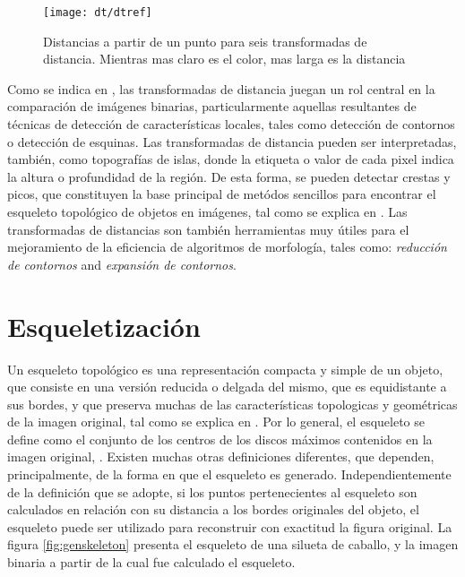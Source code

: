 \begin{figure}[h t b p ! H]
 \centering
   \texttt{[image: dt/dtref]}
 \caption[Distancias a partir de un punto para seis transformadas de distancia]{ 
   Distancias a partir de un punto para seis transformadas de distancia. Mientras 
   mas claro es el color, mas larga es la distancia \cite[p.365]{dtresearch}}
 \label{fig:dtexamples}
\end{figure}

Como se indica en \cite{dtresearch2}, las transformadas de distancia juegan un rol
central en la comparaci\'on de im\'agenes binarias, particularmente aquellas
resultantes de t\'ecnicas de detecci\'on de caracter\'isticas locales, tales 
como detecci\'on de contornos o detecci\'on de esquinas.
Las transformadas de distancia pueden ser interpretadas, tambi\'en, como
topograf\'ias de islas, donde la etiqueta o valor de cada pixel indica la altura o 
profundidad de la regi\'on. De esta forma, se pueden detectar crestas y picos, 
que constituyen la base principal de met\'odos sencillos para encontrar el 
esqueleto topol\'ogico de objetos en im\'agenes, tal como se explica en \cite[237]{ridgedt}.
Las transformadas de distancias son tambi\'en herramientas muy \'utiles para el 
mejoramiento de la eficiencia de algoritmos de morfolog\'ia, tales como: 
\emph{reducci\'on de contornos} and \emph{expansi\'on de contornos}.\\

\section{Esqueletizaci\'on}
\label{sec:skeletonization}

Un esqueleto topol\'ogico es una representaci\'on compacta y simple de un objeto, que
consiste en una versi\'on reducida o delgada del mismo, que es equidistante a sus bordes, 
y que preserva muchas de las caracter\'isticas topologicas y geom\'etricas de la
imagen original, tal como se explica en \cite{wikipedia:skeleton,ssm,augmented}. 
Por lo general, el esqueleto se define como el conjunto de los centros de los discos m\'aximos
contenidos en la imagen original, \cite{ssm,augmented}. Existen muchas otras definiciones diferentes,
que dependen, principalmente, de la forma en que el esqueleto es generado.
Independientemente de la definici\'on que se adopte, si los puntos pertenecientes al esqueleto
son calculados en relaci\'on con su distancia a los bordes originales del objeto, 
el esqueleto puede ser utilizado para reconstruir con exactitud la figura original.
La figura \ref{fig:genskeleton} presenta el esqueleto de una silueta de caballo, y la
imagen binaria a partir de la cual fue calculado el esqueleto.

